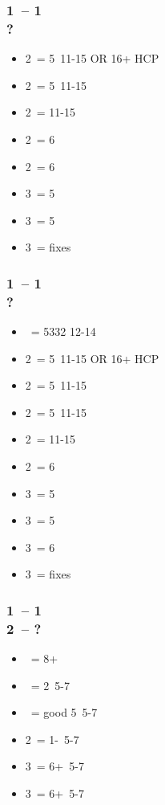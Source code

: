 \subsubsection*{1\hearts\ -- 1\ntx\ \\ ?}
\begin{itemize}
    \item 2\clubs\ = 5\hearts\clubs\ 11-15 OR 16+ HCP \fonce
    \item 2\diams\ = 5\diams\ 11-15
    \item 2\hearts\ = 11-15
    \item 2\spades\ = 6\spades\ \gf
    \item 2\ntx\ = 6\minor\ \gf
    \item 3\clubs\ = 5\clubs\ \gf
    \item 3\diams\ = 5\diams\ \gf
    \item 3\hearts\ = fixes \hearts\ \gf
\end{itemize}

\subsubsection*{1\spades\ -- 1\ntx\ \\ ?}
\begin{itemize}
    \item \pass\ = 5332 12-14
    \item 2\clubs\ = 5\spades\clubs\ 11-15 OR 16+ HCP \fonce
    \item 2\diams\ = 5\diams\ 11-15
    \item 2\hearts\ = 5\hearts\ 11-15
    \item 2\spades\ = 11-15
    \item 2\ntx\ = 6\minor\ \gf
    \item 3\clubs\ = 5\clubs\ \gf
    \item 3\diams\ = 5\diams\ \gf
    \item 3\hearts\ = 6\hearts\ \gf
    \item 3\spades\ = fixes \spades\ \gf
\end{itemize}

\subsubsection*{1\hearts\ -- 1\spades\ \\ 2\clubs\ -- ?}
\begin{itemize}
    \item \diams\ = 8+
    \item \hearts\ = 2\hearts\ 5-7
    \item \spades\ = good 5\spades\ 5-7
    \item 2\ntx\ = 1-\hearts\ 5-7
    \item 3\clubs\ = 6+\clubs\ 5-7
    \item 3\diams\ = 6+\diams\ 5-7
\end{itemize}

